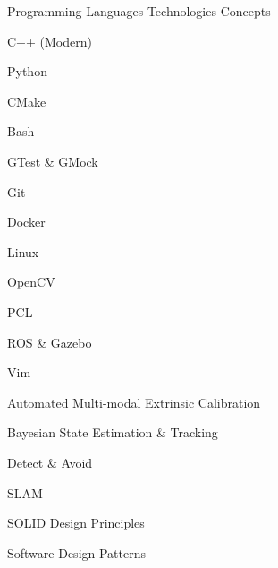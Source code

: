 
\begin{cventries}

  \cventrycol
  {Programming Languages}
  {Technologies}
  {Concepts}
  {
    \begin{cvitems}
      \item {C++ (Modern)}
      \item {Python}
      \item {CMake}
      \item {Bash}
    \end{cvitems}
  }
  {
    \begin{cvitems}
      \item {GTest \& GMock}
      \item {Git}
      \item {Docker}
      \item {Linux}
      \item {OpenCV}
      \item {PCL}
      \item {ROS \& Gazebo}
      \item {Vim}
    \end{cvitems}
  }
  {
    \begin{cvitems}
      \item {Automated Multi-modal Extrinsic Calibration}
      \item {Bayesian State Estimation \& Tracking}
      \item {Detect \& Avoid}
      \item {SLAM}
      \item {SOLID Design Principles}
      \item {Software Design Patterns}
    \end{cvitems}
  }

\end{cventries}
